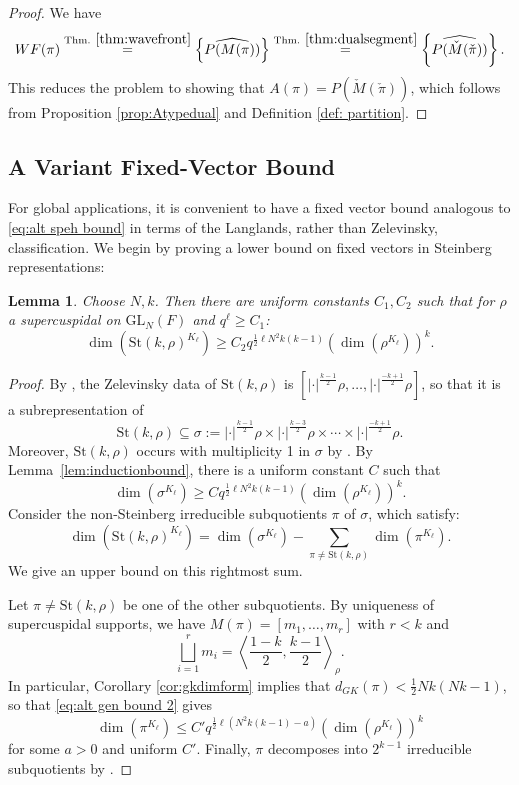 \documentclass{amsart}
\newcommand{\lf}{\left}
\newcommand{\ri}{\right}
\newcommand{\f}{\frac}
\newcommand{\GL}{\mathrm{GL}}
\newcommand{\St}{\mathrm{St}}
\newcommand{\1}{\m 1}
\newtheorem{lem}[thm]{Lemma}
\theoremstyle{remark}
\theoremstyle{definition}
\numberwithin{equation}{subsection}
\begin{document}
\begin{proof}
We have
\[
WF(\pi) \overset{\text{Thm. }\ref{thm:wavefront}}=  \left\{\widehat {P(M(\pi))}\right\} \overset{\text{Thm. }\ref{thm:dualsegment}}= \left\{\widehat{P(\check M(\check \pi))}\right\}. 
\]
This reduces the problem to showing that $A(\pi) = P(\check M (\check \pi))$, which follows from Proposition \ref{prop:Atypedual} and Definition \ref{def: partition}.
\end{proof}




\subsection{A Variant Fixed-Vector Bound}
For global applications, it is convenient to have a fixed vector bound analogous to \eqref{eq:alt speh bound} in terms of the Langlands, rather than Zelevinsky, classification. %
We begin by proving a lower bound on fixed vectors in Steinberg representations:

\begin{lem}\label{lem:steinberglower}
Choose $N,k$. Then there are uniform constants $C_1, C_2$ such that for $\rho$ a supercuspidal on $\GL_N(F)$ and $q^\ell \geq C_1$:
\[
\dim(\St(k, \rho)^{K_\ell}) \geq C_2 q^{\f12 \ell N^2k(k-1)} \lf(\dim(\rho^{K_\ell})\ri)^k.
\]
\end{lem}

\begin{proof}
By \cite[\S 9.1]{Zel80}, the Zelevinsky data of $\St(k, \rho)$ is $[|\cdot|^{\f{k-1}2} \rho, \ldots, |\cdot|^{\f{-k+1}2} \rho]$, so that it is a subrepresentation of
\[
\St(k, \rho) \subseteq \sigma:=|\cdot|^{\f{k-1}2} \rho \times |\cdot|^{\f{k-3}2} \rho \times \cdots \times |\cdot|^{\f{-k+1}2} \rho. 
\]
Moreover, $\St(k, \rho)$ occurs with multiplicity 1 in $\sigma$ by \cite[Thm 7.1]{Zel80}.  By Lemma~\ref{lem:inductionbound}, there is a uniform constant $C$ such that
\[
\dim(\sigma^{K_\ell}) \geq Cq^{\f12\ell N^2k(k-1)} \lf(\dim(\rho^{K_\ell})\ri)^k.
\]
Consider the non-Steinberg irreducible subquotients $\pi$ of $\sigma$, which satisfy:
\[
\dim(\St(k, \rho)^{K_\ell}) = \dim( \sigma^{K_\ell}) - \sum_{\pi \neq \St(k, \rho)} \dim(\pi^{K_\ell}).
\]
We give an upper bound on this rightmost sum.

Let $\pi \neq \St(k, \rho)$ be one of the other subquotients. By uniqueness of supercuspidal supports, 
we have $M(\pi) = [m_1, \dotsc, m_r]$ with $r < k$ and
\[
\bigsqcup_{i=1}^r m_i = \lf \langle \f{1-k}2, \f{k-1}2 \ri\rangle_\rho. 
\]
In particular, Corollary \ref{cor:gkdimform} implies that $d_{GK}(\pi) < \f12 Nk(Nk-1)$, so that \eqref{eq:alt gen bound 2} gives
\[
\dim(\pi^{K_\ell}) \leq C'q^{\f12\ell (N^2k(k-1) - a)} \lf(\dim(\rho^{K_\ell})\ri)^k 
\]
for some $a > 0$ and uniform $C'$. Finally, $\pi$ decomposes into $2^{k-1}$ irreducible subquotients by \cite[Cor 2.3]{Zel80}. 
\end{proof}
\end{document}
